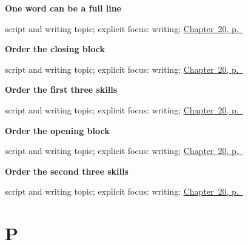 \noindent\begin{minipage}[t]{\linewidth}
\raggedright
\textbf{One word can be a full line}\par
\footnotesize script and writing topic; explicit focus: writing; \hyperref[ch:mr-a1-named-reader-message]{Chapter~20, p.~\pageref*{ch:mr-a1-named-reader-message}}
\end{minipage}\par\smallskip

\noindent\begin{minipage}[t]{\linewidth}
\raggedright
\textbf{Order the closing block}\par
\footnotesize script and writing topic; explicit focus: writing; \hyperref[ch:mr-a1-named-reader-message]{Chapter~20, p.~\pageref*{ch:mr-a1-named-reader-message}}
\end{minipage}\par\smallskip

\noindent\begin{minipage}[t]{\linewidth}
\raggedright
\textbf{Order the first three skills}\par
\footnotesize script and writing topic; explicit focus: writing; \hyperref[ch:mr-a1-named-reader-message]{Chapter~20, p.~\pageref*{ch:mr-a1-named-reader-message}}
\end{minipage}\par\smallskip

\noindent\begin{minipage}[t]{\linewidth}
\raggedright
\textbf{Order the opening block}\par
\footnotesize script and writing topic; explicit focus: writing; \hyperref[ch:mr-a1-named-reader-message]{Chapter~20, p.~\pageref*{ch:mr-a1-named-reader-message}}
\end{minipage}\par\smallskip

\noindent\begin{minipage}[t]{\linewidth}
\raggedright
\textbf{Order the second three skills}\par
\footnotesize script and writing topic; explicit focus: writing; \hyperref[ch:mr-a1-named-reader-message]{Chapter~20, p.~\pageref*{ch:mr-a1-named-reader-message}}
\end{minipage}\par\smallskip

\section*{P}


